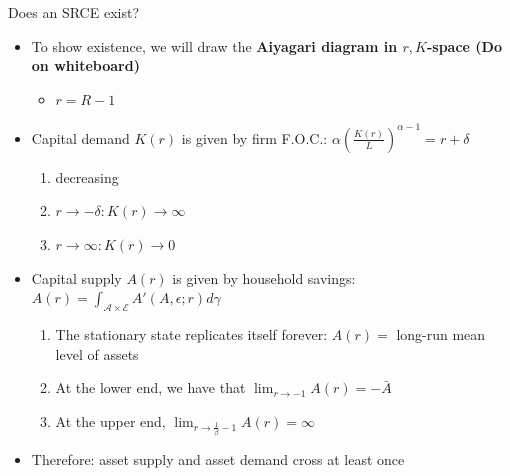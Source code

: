 \documentclass[9pt]{beamer}
\newcommand{\bit}{\begin{itemize}}
\newcommand{\eit}{\end{itemize}}
\newcommand{\ben}{\begin{enumerate}}
\newcommand{\een}{\end{enumerate}}
\newcommand{\bc}{\color{blue}}
\newcommand{\rc}{\color{red}}
\begin{document}
\begin{frame}{Does an SRCE exist?}

\bit
\setlength\itemsep{1.5em}

\item To show existence, we will draw the \bf Aiyagari diagram \normalfont in $r,K$-space {\rc (Do on whiteboard)} 
\bit
\item $r = R -1$
\eit

\item Capital demand $K(r)$ is given by firm F.O.C.: $\alpha \left(\frac{K(r)}{L}\right)^{\alpha-1} = r+\delta $
\ben
\setlength\itemsep{0.5em}
\item decreasing
\item $r \to -\delta: K(r) \to \infty$
\item $r \to \infty: K(r) \to  0$
\een

\item Capital supply $A(r)$ is given by household savings: $A(r) = \int_{\bm{\mathcal A} \times \bm{\mathcal E}} A'(A,\epsilon; r) d\gamma $
\ben
\setlength\itemsep{0.5em}
\item The stationary state replicates itself forever: $A(r) = $ long-run mean level of assets  
\item At the lower end, we have that $\lim_{r \to -1} A(r) = - \bar A$
\item {\bc At the upper end, $\lim_{r \to \frac{1}{\beta}-1} A(r) = \infty$}
\een

\item {\color{white} Therefore: asset supply and asset demand cross at least once}
\eit

\end{frame}
\end{document}
